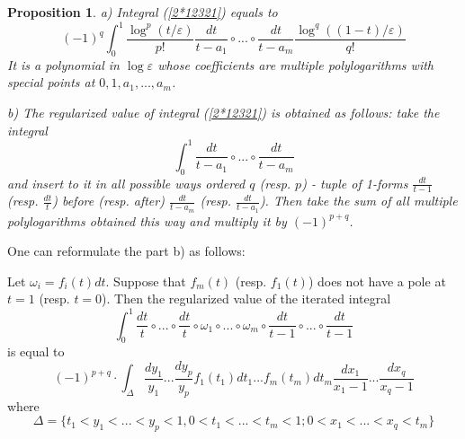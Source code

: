 \documentclass[10pt]{article}
\newtheorem{proposition}[theorem]{Proposition}
\begin{document}
\begin{proposition} \label{p2.5} a) Integral (\ref{2*12321}) equals to 
$$
(-1)^{q}\int_{0}^{1} \frac{\log^p(t/\varepsilon)}{p!} \frac{dt}{t-a_1} \circ...\circ  \frac{dt}{t-a_m}  \frac{\log^q((1-t)/\varepsilon)}{q!}
$$
It is a polynomial in $\log\varepsilon$ whose coefficients are multiple polylogarithms with special points at $0,1, a_1,...,a_m$. 


  b) The regularized value of integral (\ref{2*12321}) 
is obtained as follows: take the integral
$$
\int_0^1\frac{dt}{t-a_1}\circ ... \circ \frac{dt}{t-a_m} 
$$
and insert to it in all possible ways ordered $q$ (resp. $p$) - tuple of 1-forms $\frac{dt}{t-1}$ (resp. $\frac{dt}{t}$) before (resp. after)
$\frac{dt}{t-a_m}$ (resp. $\frac{dt}{t-a_1}$). 
Then take the sum of all multiple polylogarithms obtained this  way and multiply it by $(-1)^{p+q}$.
\end{proposition}


One can reformulate the part b) as follows:

Let $\omega_i = f_i(t)dt$. Suppose that $f_{m}(t)$ (resp.
$f_{1}(t)$) does not have a pole at $t=1$ (resp. $t = 0$). Then the regularized value of the iterated integral
\begin{equation} \label{r1}
\int_0^1\frac{dt}{t}\circ...\circ\frac{dt}{t}\circ\omega_1\circ...\circ\omega_{m}\circ \frac{dt}{t-1}\circ...\circ\frac{dt}{t-1}
\end{equation}
is equal to 
\begin{equation} \label{r2}
(-1)^{p+q}\cdot \int_{\Delta}\frac{dy_1}{y_1}...\frac{dy_p}{y_p}f_1(t_1)dt_1 ...f_{m}(t_{m})dt_m
\frac{dx_1}{x_1-1}...\frac{dx_q}{x_q-1}
\end{equation}
where
$$
\Delta = \{t_1 < y_1 < ... < y_p < 1,   0 < t_1 < ... < t_{m} < 1; 0 < x_1 < ... < x_q < t_{m} \}
$$
\end{document}

